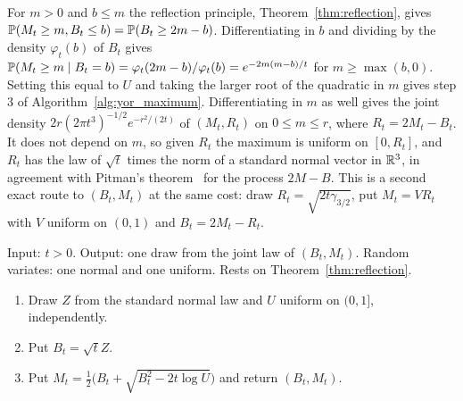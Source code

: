 For $m>0$ and $b\le m$ the reflection principle, Theorem~\ref{thm:reflection}, gives $\P(M_t\ge m,B_t\le b)=\P(B_t\ge2m-b)$. Differentiating in $b$ and dividing by the density $\varphi_t(b)$ of $B_t$ gives $\P(M_t\ge m\mid B_t=b)=\varphi_t(2m-b)/\varphi_t(b)=e^{-2m(m-b)/t}$ for $m\ge\max(b,0)$. Setting this equal to $U$ and taking the larger root of the quadratic in $m$ gives step 3 of Algorithm~\ref{alg:yor_maximum}. Differentiating in $m$ as well gives the joint density $2r(2\pi t^3)^{-1/2}e^{-r^2/(2t)}$ of $(M_t,R_t)$ on $0\le m\le r$, where $R_t=2M_t-B_t$. It does not depend on $m$, so given $R_t$ the maximum is uniform on $[0,R_t]$, and $R_t$ has the law of $\sqrt t$ times the norm of a standard normal vector in $\R^3$, in agreement with Pitman's theorem~\cite{pitman1975} for the process $2M-B$. This is a second exact route to $(B_t,M_t)$ at the same cost: draw $R_t=\sqrt{2t\gamma_{3/2}}$, put $M_t=VR_t$ with $V$ uniform on $(0,1)$ and $B_t=2M_t-R_t$.

\begin{samepage}
\begin{algorithm}\label{alg:yor_maximum}
Input: $t>0$. Output: one draw from the joint law of $(B_t,M_t)$. Random variates: one normal and one uniform. Rests on Theorem~\ref{thm:reflection}.
\begin{enumerate}[nosep]
\item Draw $Z$ from the standard normal law and $U$ uniform on $(0,1]$, independently.
\item Put $B_t=\sqrt tZ$.
\item Put $M_t=\frac12\big(B_t+\sqrt{B_t^2-2t\log U}\big)$ and return $(B_t,M_t)$.
\end{enumerate}
\end{algorithm}
\end{samepage}

